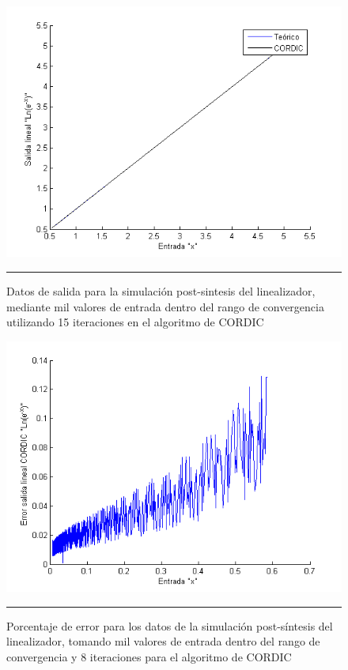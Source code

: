 \begin{figure}[H]
  \centering
    \includegraphics[scale=0.8]{./RANGO_15iter.png}
    \rule{35em}{0.5pt}
  \caption[Datos de salida para la simulación post-sintesis del linealizador, mediante mil valores de entrada dentro del rango de convergencia utilizando 15 iteraciones en el algoritmo de CORDIC]{Datos de salida para la simulación post-sintesis del linealizador, mediante mil valores de entrada dentro del rango de convergencia utilizando 15 iteraciones en el algoritmo de CORDIC}
  \label{fig:RG15}
\end{figure}

\newpage

\begin{figure}[H]
  \centering
    \includegraphics[scale=0.8]{./RANGO_15iter_ERROR.png}
    \rule{35em}{0.5pt}
  \caption[Porcentaje de error para los datos de la simulación post-síntesis del linealizador, tomando mil valores de entrada dentro del rango de convergencia y  8 iteraciones para el algoritmo de CORDIC]{Porcentaje de error para los datos de la simulación post-síntesis del linealizador, tomando mil valores de entrada dentro del rango de convergencia y  8 iteraciones para el algoritmo de CORDIC}
  \label{fig:RGE15}
\end{figure}



